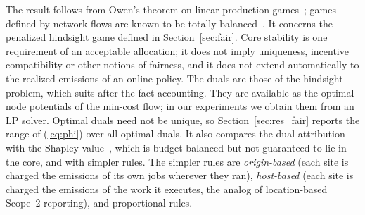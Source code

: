 The result follows from Owen's theorem on linear production games~\cite{owen1975core}; games defined by network flows are known to be totally balanced~\cite{kalai1982totally}. It concerns the penalized hindsight game defined in Section~\ref{sec:fair}. Core stability is one requirement of an acceptable allocation; it does not imply uniqueness, incentive compatibility or other notions of fairness, and it does not extend automatically to the realized emissions of an online policy. The duals are those of the hindsight problem, which suits after-the-fact accounting. They are available as the optimal node potentials of the min-cost flow; in our experiments we obtain them from an LP solver. Optimal duals need not be unique, so Section~\ref{sec:res_fair} reports the range of (\ref{eq:phi}) over all optimal duals. It also compares the dual attribution with the Shapley value~\cite{shapley1953value}, which is budget-balanced but not guaranteed to lie in the core, and with simpler rules. The simpler rules are \emph{origin-based} (each site is charged the emissions of its own jobs wherever they ran), \emph{host-based} (each site is charged the emissions of the work it executes, the analog of location-based Scope~2 reporting), and proportional rules.
